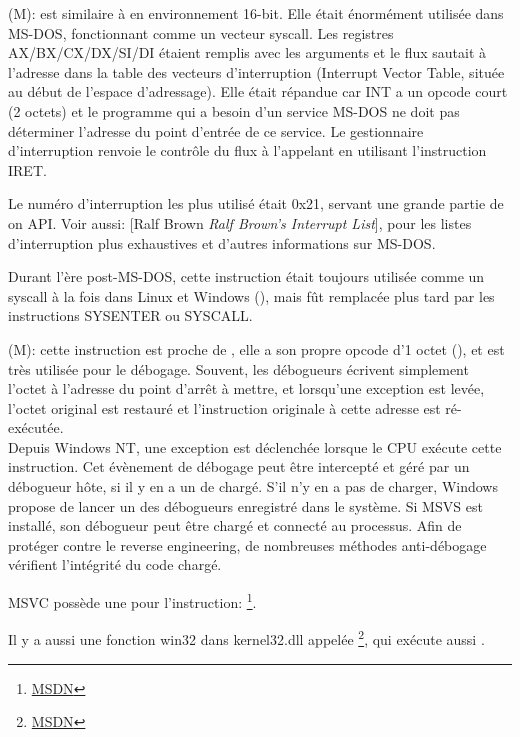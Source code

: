 
\item[INT] (M):  est similaire à 
en environnement 16-bit.
  Elle était énormément utilisée dans MS-DOS, fonctionnant comme un vecteur syscall.
  Les registres AX/BX/CX/DX/SI/DI étaient remplis avec les arguments et le flux sautait
  à l'adresse dans la table des vecteurs d'interruption (Interrupt Vector Table,
  située au début de l'espace d'adressage).
  Elle était répandue car INT a un opcode court (2 octets) et le programme qui a
  besoin d'un service MS-DOS ne doit pas déterminer l'adresse du point d'entrée de
  ce service.
  Le gestionnaire d'interruption renvoie le contrôle du flux à l'appelant en utilisant
  l'instruction IRET.

  Le numéro d'interruption les plus utilisé était 0x21, servant une grande partie
  de on \ac{API}.
  Voir aussi: [Ralf Brown \emph{Ralf Brown's Interrupt List}],
  pour les listes d'interruption plus exhaustives et d'autres informations sur MS-DOS.

  Durant l'ère post-MS-DOS, cette instruction était toujours utilisée comme un syscall
  à la fois dans Linux et Windows (), mais fût remplacée plus tard
  par les instructions SYSENTER ou SYSCALL.

\item[INT 3] (M): cette instruction est proche de
, elle a son propre opcode d'1 octet (),
et est très utilisée pour le débogage.
Souvent, les débogueurs écrivent simplement l'octet  à l'adresse du point
d'arrêt à mettre, et lorsqu'une exception est levée, l'octet original est restauré
et l'instruction originale à cette adresse est ré-exécutée. \\
Depuis \gls{Windows NT}, une exception  est déclenchée
lorsque le \ac{CPU} exécute cette instruction.
Cet évènement de débogage peut être intercepté et géré par un débogueur hôte, si
il y en a un de chargé.
S'il n'y en a pas de charger, Windows propose de lancer un des débogueurs enregistré
dans le système.
Si \ac{MSVS} est installé, son débogueur peut être chargé et connecté au processus.
Afin de protéger contre le \gls{reverse engineering}, de nombreuses méthodes anti-débogage
vérifient l'intégrité du code chargé.

\ac{MSVC} possède une  pour l'instruction:
\footnote{\href{http://go.yurichev.com/17226}{MSDN}}.


Il y a aussi une fonction win32 dans kernel32.dll appelée
\footnote{\href{http://go.yurichev.com/17227}{MSDN}},
qui exécute aussi .

